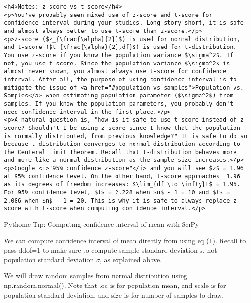 \documentclass[11pt]{article}
\begin{document}
\begin{verbatim}
<h4>Notes: z-score vs t-score</h4>
<p>You've probably seen mixed use of z-score and t-score for confidence interval during your studies. Long story short, it is safe and almost always better to use t-score than z-score.</p>
<p>Z-score ($z_{\frac{\alpha}{2}}$) is used for normal distribution, and t-score ($t_{\frac{\alpha}{2},df}$) is used for t-distribution. You use z-score if you know the population variance $\sigma^2$. If not, you use t-score. Since the population variance $\sigma^2$ is almost never known, you almost always use t-score for confidence interval. After all, the purpose of using confidence interval is to mitigate the issue of <a href="#population_vs_samples">Population vs. Samples</a> when estimating population parameter ($\sigma^2$) from samples. If you know the population parameters, you probably don't need confidence interval in the first place.</p>
<p>A natural question is, "how is it safe to use t-score instead of z-score? Shouldn't I be using z-score since I know that the population is normally distributed, from previous knowledge?" It is safe to do so because t-distribution converges to normal distribution according to the Centeral Limit Theorem. Recall that t-distribution behaves more and more like a normal distribution as the sample size increases.</p>
<p>Google <i>"95% confidence z-score"</i> and you will see $z$ = 1.96 at 95% confidence level. On the other hand, t-score approaches  1.96 as its degrees of freedom increases: $\lim_{df \to \infty}t$ = 1.96. For 95% confidence level, $t$ = 2.228 when $n$ - 1 = 10 and $t$ = 2.086 when $n$ - 1 = 20. This is why it is safe to always replace z-score with t-score when computing confidence interval.</p>
\end{verbatim}

    \hypertarget{python_ci_mean}{}

Pythonic Tip: Computing confidence interval of mean with SciPy

We can compute confidence interval of mean directly from using eq (1).
Recall to pass ddof=1 to make sure to compute sample standard deviation
\(s\), not population standard deviation \(\sigma\), as explained above.

We will draw random samples from normal distribution using
np.random.normal(). Note that loc is for population mean, and scale is
for population standard deviation, and size is for number of samples to
draw.
\end{document}
